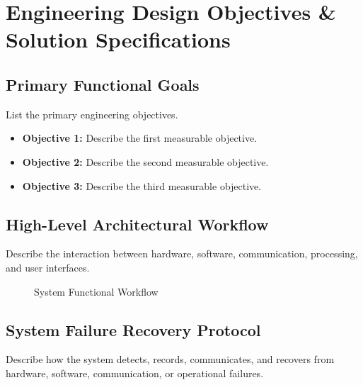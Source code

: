 
\section{Engineering Design Objectives \& Solution Specifications}

\subsection{Primary Functional Goals}

List the primary engineering objectives.

\begin{itemize}
    \item \textbf{Objective 1:} Describe the first measurable objective.
    \item \textbf{Objective 2:} Describe the second measurable objective.
    \item \textbf{Objective 3:} Describe the third measurable objective.
\end{itemize}

\subsection{High-Level Architectural Workflow}

Describe the interaction between hardware, software, communication,
processing, and user interfaces.

\begin{figure}[h!]
    \centering
    \caption{System Functional Workflow}
\end{figure}

\subsection{System Failure Recovery Protocol}

Describe how the system detects, records, communicates, and recovers from
hardware, software, communication, or operational failures.
